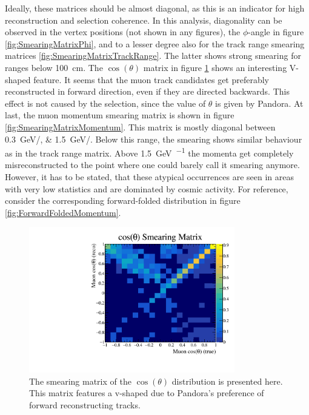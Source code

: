 Ideally, these matrices should be almost diagonal, as this is an indicator for high reconstruction and selection coherence. In this analysis, diagonality can be observed in the vertex positions (not shown in any figures), the $\phi$-angle in figure \ref{fig:SmearingMatrixPhi}, and to a lesser degree also for the track range smearing matrices \ref{fig:SmearingMatrixTrackRange}. The latter shows strong smearing for ranges below \SI{100}{\centi\metre}. The $\cos{(\theta)}$ matrix in figure \ref{fig:SmearingMatrixCosTheta} shows an interesting V-shaped feature. It seems that the muon track candidates get preferably reconstructed in forward direction, even if they are directed backwards. This effect is not caused by the selection, since the value of $\theta$ is given by \gls{Pandora}. At last, the muon momentum smearing matrix is shown in figure \ref{fig:SmearingMatrixMomentum}. This matrix is mostly diagonal between \SIlist[per-mode = symbol]{0.3;1.5}{\giga\electronvolt\per\lightspeed}. Below this range, the smearing shows similar behaviour as in the track range matrix. Above  \SI[per-mode = symbol]{1.5}{\giga\electronvolt\per\lightspeed} the momenta get completely misreconstructed to the point where one could barely call it smearing anymore. However, it has to be stated, that these atypical occurrences are seen in areas with very low statistics and are dominated by cosmic activity. For reference, consider the corresponding forward-folded distribution in figure \ref{fig:ForwardFoldedMomentum}.
\begin{figure}[htbp]
    \centering
    \includegraphics[width=0.8\textwidth]{images/FirstCCInclusive/Smearing/SmearingMatrixCosTheta.pdf}
    \caption[Smearing Matrices of the $\cos{(\theta)}$ Distribution]{The smearing matrix of the $\cos{(\theta)}$ distribution is presented here. This matrix features a v-shaped due to \gls{Pandora}'s preference of forward reconstructing tracks.}
    \label{fig:SmearingMatrixCosTheta}
\end{figure}
